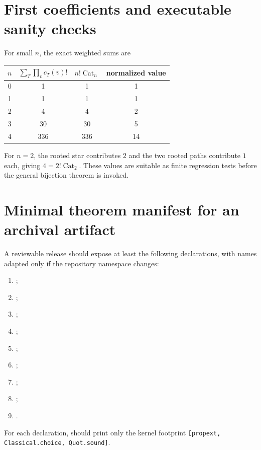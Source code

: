 \documentclass[11pt,a4paper]{article}
\theoremstyle{definition}
\newcommand{\Cat}{\operatorname{Cat}}
\begin{document}
\section{First coefficients and executable sanity checks}

For small $n$, the exact weighted sums are
\begin{center}
\begin{tabular}{c@{\qquad}c@{\qquad}c@{\qquad}c}
\toprule
$n$ & $\sum_T\prod_v c_T(v)!$ & $n!\Cat_n$ & normalized value \\
\midrule
0 & 1   & 1   & 1 \\
1 & 1   & 1   & 1 \\
2 & 4   & 4   & 2 \\
3 & 30  & 30  & 5 \\
4 & 336 & 336 & 14 \\
\bottomrule
\end{tabular}
\end{center}
For $n=2$, the rooted star contributes $2$ and the two rooted paths contribute $1$ each,
giving $4=2!\Cat_2$.  These values are suitable as finite regression tests before the
general bijection theorem is invoked.

\section{Minimal theorem manifest for an archival artifact}

A reviewable release should expose at least the following declarations, with names
adapted only if the repository namespace changes:
\begin{enumerate}
\item {};
\item {};
\item {};
\item {};
\item {};
\item {};
\item {};
\item {};
\item {}.
\end{enumerate}
For each declaration,  should print only the kernel footprint
\texttt{[propext, Classical.choice, Quot.sound]}.
\end{document}
